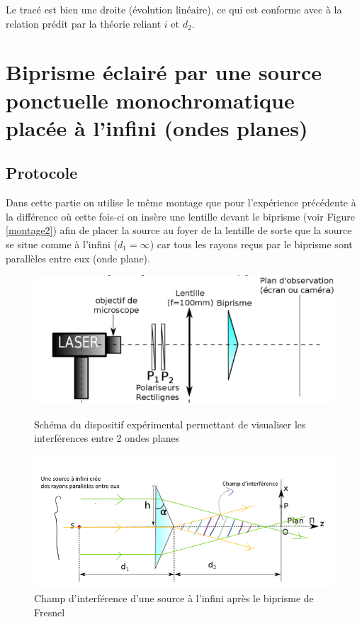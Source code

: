 \documentclass[11pt, a4paper]{article}
\begin{document}
Le tracé est bien une droite (évolution linéaire), ce qui est conforme avec à la relation prédit par la théorie reliant $i$ et $d_2$.


\section{Biprisme éclairé par une source ponctuelle monochromatique placée à l'infini (ondes planes)}
\subsection{Protocole}
Dans cette partie on utilise le même montage que pour l'expérience précédente à la différence où cette fois-ci on insère une lentille devant le biprisme (voir Figure \ref{montage2}) afin de placer la source au foyer de la lentille de sorte que la source se situe comme à l'infini ($d_1=\infty$) car tous les rayons reçus par le biprisme sont parallèles entre eux (onde plane).

\begin{figure}[htbp]
    \centering
    \begin{minipage}[t]{0.48\textwidth}
        \centering
        \includegraphics[width=\textwidth]{images/montage2.png}
        \caption{Schéma du dispositif expérimental permettant de visualiser les interférences entre 2 ondes planes}
        \label{montage2}
    \end{minipage}
    \hfill
    \begin{minipage}[t]{0.48\textwidth}
        \centering
        \includegraphics[width=\textwidth]{images/champs2.png}
        \caption{Champ d'interférence d'une source à l'infini après le biprisme de Fresnel}
        \label{champs2}
    \end{minipage}
\end{figure}
\end{document}

